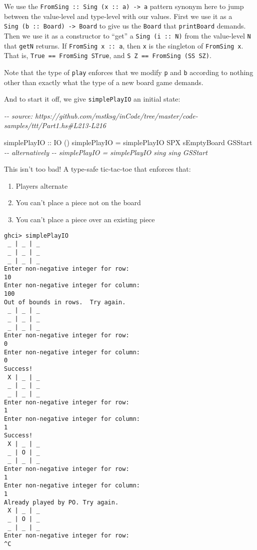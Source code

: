 \documentclass[]{article}
\newenvironment{Shaded}{}{}
\newcommand{\CommentTok}[1]{\textcolor[rgb]{0.38,0.63,0.69}{\textit{#1}}}
\newcommand{\DataTypeTok}[1]{\textcolor[rgb]{0.56,0.13,0.00}{#1}}
\newcommand{\NormalTok}[1]{#1}
\newcommand{\OtherTok}[1]{\textcolor[rgb]{0.00,0.44,0.13}{#1}}
\begin{document}
We use the \texttt{FromSing\ ::\ Sing\ (x\ ::\ a)\ -\textgreater{}\ a} pattern
synonym here to jump between the value-level and type-level with our values.
First we use it as a \texttt{Sing\ (b\ ::\ Board)\ -\textgreater{}\ Board} to
give us the \texttt{Board} that \texttt{printBoard} demands. Then we use it as a
constructor to ``get'' a \texttt{Sing\ (i\ ::\ N)} from the value-level
\texttt{N} that \texttt{getN} returns. If \texttt{FromSing\ x\ ::\ a}, then
\texttt{x} is the singleton of \texttt{FromSing\ x}. That is,
\texttt{True\ ==\ FromSing\ STrue}, and \texttt{S\ Z\ ==\ FromSing\ (SS\ SZ)}.

Note that the type of \texttt{play} enforces that we modify \texttt{p} and
\texttt{b} according to nothing other than exactly what the type of a new board
game demands.

And to start it off, we give \texttt{simplePlayIO\textquotesingle{}} an initial
state:

\begin{Shaded}
\begin{Highlighting}[]
\CommentTok{{-}{-} source: https://github.com/mstksg/inCode/tree/master/code{-}samples/ttt/Part1.hs\#L213{-}L216}

\OtherTok{simplePlayIO ::} \DataTypeTok{IO}\NormalTok{ ()}
\NormalTok{simplePlayIO }\OtherTok{=}\NormalTok{ simplePlayIO\textquotesingle{} }\DataTypeTok{SPX}\NormalTok{ sEmptyBoard }\DataTypeTok{GSStart}
\CommentTok{{-}{-} alternatively}
\CommentTok{{-}{-} simplePlayIO = simplePlayIO\textquotesingle{} sing sing GSStart}
\end{Highlighting}
\end{Shaded}

This isn't too bad! A type-safe tic-tac-toe that enforces that:

\begin{enumerate}
\def\labelenumi{\arabic{enumi}.}
\tightlist
\item
  Players alternate
\item
  You can't place a piece not on the board
\item
  You can't place a piece over an existing piece
\end{enumerate}

\begin{verbatim}
ghci> simplePlayIO
 _ | _ | _
 _ | _ | _
 _ | _ | _
Enter non-negative integer for row:
10
Enter non-negative integer for column:
100
Out of bounds in rows.  Try again.
 _ | _ | _
 _ | _ | _
 _ | _ | _
Enter non-negative integer for row:
0
Enter non-negative integer for column:
0
Success!
 X | _ | _
 _ | _ | _
 _ | _ | _
Enter non-negative integer for row:
1
Enter non-negative integer for column:
1
Success!
 X | _ | _
 _ | O | _
 _ | _ | _
Enter non-negative integer for row:
1
Enter non-negative integer for column:
1
Already played by PO. Try again.
 X | _ | _
 _ | O | _
 _ | _ | _
Enter non-negative integer for row:
^C
\end{verbatim}
\end{document}
